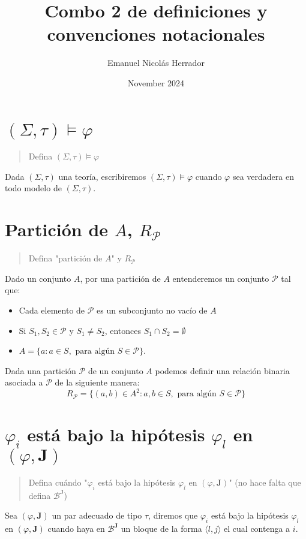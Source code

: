 \documentclass{article}
\title{Combo 2 de definiciones y convenciones notacionales}
\author{Emanuel Nicolás Herrador}
\date{November 2024}
\begin{document}
\maketitle

\section{$(\Sigma,\tau)\vDash\varphi$}
\begin{quote}
  Defina $(\Sigma,\tau)\vDash\varphi$
\end{quote}
Dada $(\Sigma,\tau)$ una teoría, escribiremos $(\Sigma,\tau)\vDash\varphi$ cuando $\varphi$ sea verdadera en todo modelo de $(\Sigma,\tau)$.

\section{Partición de $A$, $R_\mathcal{P}$}
\begin{quote}
  Defina "partición de $A$" y $R_\mathcal{P}$
\end{quote}
Dado un conjunto $A$, por una partición de $A$ entenderemos un conjunto $\mathcal{P}$ tal que:
\begin{itemize}
  \item Cada elemento de $\mathcal{P}$ es un subconjunto no vacío de $A$
  \item Si $S_1,S_2\in\mathcal{P}$ y $S_1\neq S_2$, entonces $S_1\cap S_2=\emptyset$
  \item $A=\{a:a\in S,\text{ para algún }S\in\mathcal{P}\}$.
\end{itemize}
Dada una partición $\mathcal{P}$ de un conjunto $A$ podemos definir una relación binaria asociada a $\mathcal{P}$ de la siguiente manera:
\begin{equation*}
  R_\mathcal{P}=\{(a,b)\in A^2:a,b\in S,\text{ para algún }S\in\mathcal{P}\}
\end{equation*}

\section{$\varphi_i$ está bajo la hipótesis $\varphi_l$ en $(\varphi,\mathbf{J})$}
\begin{quote}
  Defina cuándo "$\varphi_i$ está bajo la hipótesis $\varphi_l$ en $(\varphi,\mathbf{J})$" (no hace falta que defina $\mathcal{B}^\mathbf{J}$)
\end{quote}
Sea $(\varphi,\mathbf{J})$ un par adecuado de tipo $\tau$, diremos que $\varphi_i$ está bajo la hipótesis $\varphi_l$ en $(\varphi,\mathbf{J})$ cuando haya en $\mathcal{B}^\mathbf{J}$ un bloque de la forma $\langle l,j\rangle$ el cual contenga a $i$.
\end{document}
